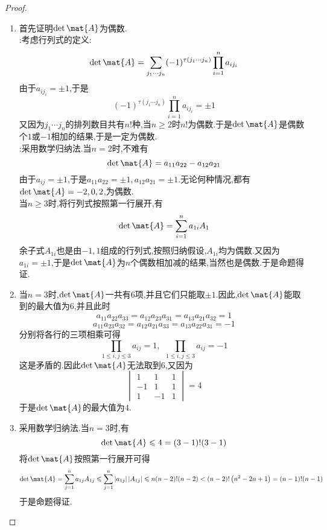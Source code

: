 \documentclass{ctexart}
\begin{document}
\begin{proof}\ 
    \begin{enumerate}[label=\tbf{\arabic*}.,topsep=0pt,parsep=0pt,itemsep=0pt,partopsep=0pt]
        \item 首先证明$\det\mat{A}$为偶数.\\
            :考虑行列式的定义:
            \[\det\mat{A}=\sum_{j_1\cdots j_n}(-1)^{\tau\left(j_1\cdots j_n\right)}\prod_{i=1}^{n}a_{ij_{i}}\]
            由于$a_{ij_i}=\pm1$,于是
            \[(-1)^{\tau\left(j_1\cdots j_n\right)}\prod_{i=1}^{n}a_{ij_{i}}=\pm1\]
            又因为$j_1\cdots j_n$的排列数目共有$n!$种,当$n\geqslant2$时$n!$为偶数.于是$\det\mat{A}$是偶数个$1$或$-1$相加的结果,于是一定为偶数.\\
            \tbf{方法二}:采用数学归纳法.当$n=2$时,不难有
            \[\det\mat{A}=a_{11}a_{22}-a_{12}a_{21}\]
            由于$a_{ij}=\pm1$,于是$a_{11}a_{22}=\pm1,a_{12}a_{21}=\pm1$.无论何种情况,都有$\det\mat{A}=-2,0,2$,为偶数.\\
            当$n\geqslant3$时,将行列式按照第一行展开,有
            \[\det\mat{A}=\sum_{i=1}^{n}a_{1i}A_{1}\]
            余子式$A_{1i}$也是由$-1,1$组成的行列式,按照归纳假设,$A_{1i}$均为偶数.又因为$a_{1i}=\pm1$,于是$\det\mat{A}$为$n$个偶数相加减的结果,当然也是偶数.于是命题得证.
        \item 当$n=3$时,$\det\mat{A}$一共有$6$项,并且它们只能取$\pm1$.因此,$\det\mat{A}$能取到的最大值为$6$,并且此时
            \[a_{11}a_{22}a_{33}=a_{12}a_{23}a_{31}=a_{13}a_{21}a_{32}=1\]
            \[a_{11}a_{23}a_{32}=a_{12}a_{21}a_{33}=a_{13}a_{22}a_{31}=-1\]
            分别将各行的三项相乘可得
            \[\prod_{1\leqslant i,j\leqslant3}a_{ij}=1,\ \ \prod_{1\leqslant i,j\leqslant3}a_{ij}=-1\]
            这是矛盾的.因此$\det\mat{A}$无法取到$6$,又因为
            \[\begin{vmatrix}
                1&1&1\\-1&1&1\\1&-1&1
            \end{vmatrix}=4\]
            于是$\det\mat{A}$的最大值为$4$.
        \item 采用数学归纳法.当$n=3$时,有
            \[\det\mat{A}\leqslant4=(3-1)!(3-1)\]
            将$\det\mat{A}$按照第一行展开可得
            \[\det\mat{A}=\sum_{j=1}^{n}a_{1j}A_{1j}\leqslant\sum_{j=1}^{n}\left|a_{1j}\right|\left|A_{1j}\right|\leqslant n(n-2)!(n-2)<(n-2)!\left(n^2-2n+1\right)=(n-1)!(n-1)\]
            于是命题得证.
    \end{enumerate}
\end{proof}
\end{document}
